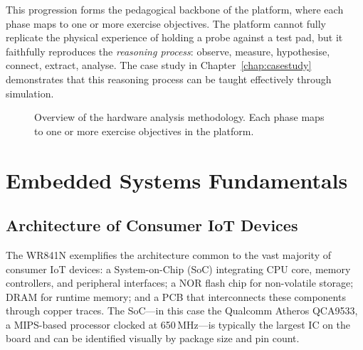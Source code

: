 This progression forms the pedagogical backbone of the \pcbctf{} platform, where each phase maps to one or more exercise objectives. The platform cannot fully replicate the physical experience of holding a probe against a test pad, but it faithfully reproduces the \emph{reasoning process}: observe, measure, hypothesise, connect, extract, analyse. The case study in Chapter~\ref{chap:casestudy} demonstrates that this reasoning process can be taught effectively through simulation.

\begin{figure}[ht]
    \centering
    \caption{Overview of the hardware analysis methodology. Each phase maps to one or more exercise objectives in the \pcbctf{} platform.}
    \label{fig:hw-methodology}
\end{figure}

\section{Embedded Systems Fundamentals}\label{sec:embedded}

\subsection{Architecture of Consumer IoT Devices}\label{subsec:embedded-def}

The WR841N exemplifies the architecture common to the vast majority of consumer IoT devices: a System-on-Chip (SoC) integrating CPU core, memory controllers, and peripheral interfaces; a NOR flash chip for non-volatile storage; DRAM for runtime memory; and a PCB that interconnects these components through copper traces. The SoC---in this case the Qualcomm Atheros QCA9533, a MIPS-based processor clocked at 650\,MHz---is typically the largest IC on the board and can be identified visually by package size and pin count.


